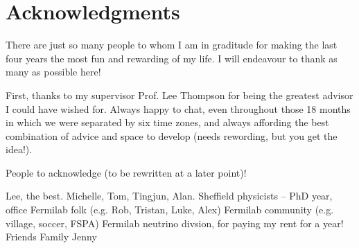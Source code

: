 
\chapter*{Acknowledgments}

There are just so many people to whom I am in graditude for making the last four years the most fun and rewarding of my life.  I will endeavour to thank as many as possible here!

First, thanks to my supervisor Prof. Lee Thompson for being the greatest advisor I could have wished for.  Always happy to chat, even throughout those 18 months in which we were separated by six time zones, and always affording the best combination of advice and space to develop (needs rewording, but you get the idea!).

People to acknowledge (to be rewritten at a later point)!

Lee, the best.
Michelle, Tom, Tingjun, Alan.
Sheffield physicists -- PhD year, office
Fermilab folk (e.g. Rob, Tristan, Luke, Alex)
Fermilab community (e.g. village, soccer, FSPA)
Fermilab neutrino divsion, for paying my rent for a year!
Friends
Family
Jenny
